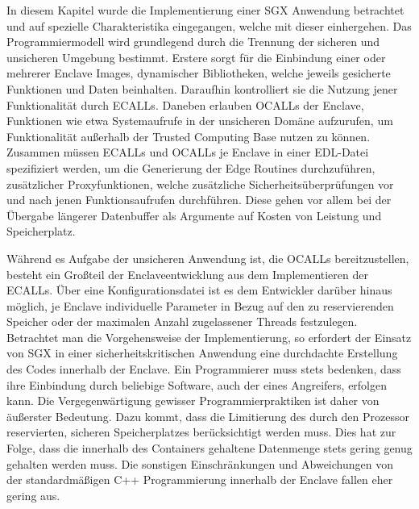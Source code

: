 In diesem Kapitel wurde die Implementierung einer SGX Anwendung betrachtet und auf spezielle Charakteristika eingegangen, welche mit dieser einhergehen. Das Programmiermodell wird grundlegend durch die Trennung der sicheren und unsicheren Umgebung bestimmt. Erstere sorgt für die Einbindung einer oder mehrerer Enclave Images, dynamischer Bibliotheken, welche jeweils gesicherte Funktionen und Daten beinhalten. Daraufhin kontrolliert sie die Nutzung jener Funktionalität durch ECALLs. Daneben erlauben OCALLs der Enclave, Funktionen wie etwa Systemaufrufe in der unsicheren Domäne aufzurufen, um Funktionalität außerhalb der Trusted Computing Base nutzen zu können. Zusammen müssen ECALLs und OCALLs je Enclave in einer EDL-Datei spezifiziert werden, um die Generierung der Edge Routines durchzuführen, zusätzlicher Proxyfunktionen, welche zusätzliche Sicherheitsüberprüfungen vor und nach jenen Funktionsaufrufen durchführen. Diese gehen vor allem bei der Übergabe längerer Datenbuffer als Argumente auf Kosten von Leistung und Speicherplatz.

Während es Aufgabe der unsicheren Anwendung ist, die OCALLs bereitzustellen, besteht ein Großteil der Enclaveentwicklung aus dem Implementieren der ECALLs. Über eine Konfigurationsdatei ist es dem Entwickler darüber hinaus möglich, je Enclave individuelle Parameter in Bezug auf den zu reservierenden Speicher oder der maximalen Anzahl zugelassener Threads festzulegen. Betrachtet man die Vorgehensweise der Implementierung, so erfordert der Einsatz von SGX in einer sicherheitskritischen Anwendung eine durchdachte Erstellung des Codes innerhalb der Enclave. Ein Programmierer muss stets bedenken, dass ihre Einbindung durch beliebige Software, auch der eines Angreifers, erfolgen kann. Die Vergegenwärtigung gewisser Programmierpraktiken ist daher von äußerster Bedeutung. Dazu kommt, dass die Limitierung des durch den Prozessor reservierten, sicheren Speicherplatzes berücksichtigt werden muss. Dies hat zur Folge, dass die innerhalb des Containers gehaltene Datenmenge stets gering genug gehalten werden muss. Die sonstigen Einschränkungen und Abweichungen von der standardmäßigen C++ Programmierung innerhalb der Enclave fallen eher gering aus.